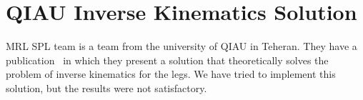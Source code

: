 \section{QIAU Inverse Kinematics Solution}
MRL SPL team is a team from the university of QIAU in Teheran. They have a publication~\cite{iran} in which they present a solution that theoretically solves the problem of inverse kinematics for the legs. We have tried to implement this solution, but the results were not satisfactory.